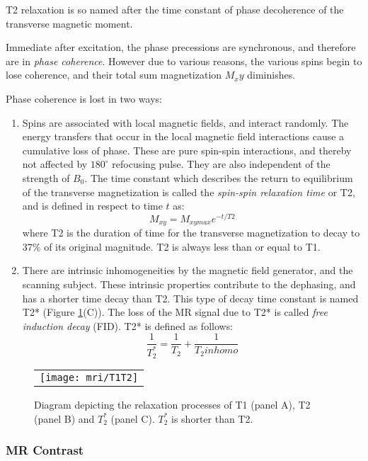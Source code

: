 T2 relaxation is so named after the time constant of phase decoherence of the transverse magnetic moment. 

Immediate after excitation, the phase precessions are synchronous, and therefore are in \textit{phase coherence}.  
However due to various reasons, the various spins begin to lose coherence, and their total sum magnetization $M_xy$ diminishes. 

Phase coherence is lost in two ways:
\begin{enumerate}
\item Spins are associated with local magnetic fields, and interact randomly. The energy transfers that occur in the local magnetic field interactions cause a cumulative loss of phase. These are pure spin-spin interactions, and thereby not affected by $180^\circ$ refocusing pulse. They are also independent of the strength of $B_0$. 
The time constant which describes the return to equilibrium of the transverse magnetization is called the \textit{spin-spin
relaxation time} or T2, and is defined in respect to time $t$ as:
$$M_{xy} =M_{xymax} e^{-t/T2}$$
where T2 is the duration of time for the transverse magnetization to decay to 37$\%$ of its original magnitude. 
T2 is always less than or equal to T1.

\item There are intrinsic inhomogeneities by the magnetic field generator, and the scanning subject. These intrinsic properties contribute to the dephasing, and has a shorter time decay than T2. This type of decay time constant is named T2*  (Figure \ref{fig:T1T2}(C)). The loss of the MR signal due to T2* is called\textit{ free induction decay} (FID). T2* is defined as follows: 
$$ \frac{1}{T_2^*} = \frac{1}{T_2} + \frac{1}{T_2inhomo}$$ 
\end{enumerate}

\begin{figure}[ht]
\begin{center}
\begin{tabular}{c}
\texttt{[image: mri/T1T2]}
\end{tabular}
\caption{Diagram depicting the relaxation processes of T1 (panel A), T2 (panel B) and $T_2^*$ (panel C). $T_2^*$ is shorter than T2.} \label{fig:T1T2}
\end{center}
\end{figure}

\subsubsection{MR Contrast}

